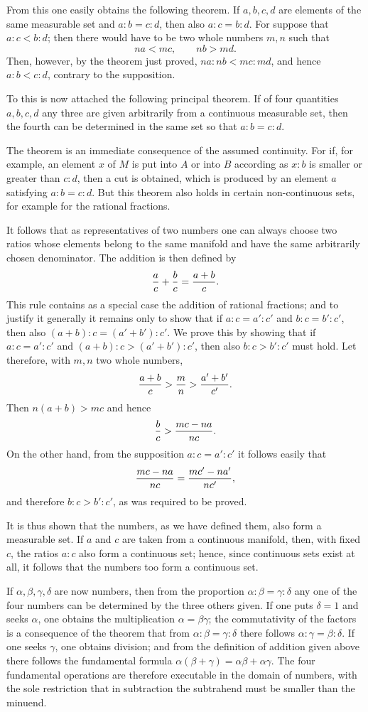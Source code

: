 \documentclass[11pt]{article}
\begin{document}
From this one easily obtains the following theorem. If $a,b,c,d$ are elements of the same measurable set and $a:b=c:d$, then also $a:c=b:d$. For suppose that $a:c<b:d$; then there would have to be two whole numbers $m,n$ such that
\[
 na<mc,
 \qquad nb>md.
\]
Then, however, by the theorem just proved, $na:nb<mc:md$, and hence $a:b<c:d$, contrary to the supposition.

To this is now attached the following principal theorem. If of four quantities $a,b,c,d$ any three are given arbitrarily from a continuous measurable set, then the fourth can be determined in the same set so that $a:b=c:d$.

The theorem is an immediate consequence of the assumed continuity. For if, for example, an element $x$ of $M$ is put into $A$ or into $B$ according as $x:b$ is smaller or greater than $c:d$, then a cut is obtained, which is produced by an element $a$ satisfying $a:b=c:d$. But this theorem also holds in certain non-continuous sets, for example for the rational fractions.

It follows that as representatives of two numbers one can always choose two ratios whose elements belong to the same manifold and have the same arbitrarily chosen denominator. The addition is then defined by
\[
 {a\over c}+{b\over c}={a+b\over c}.
\]
This rule contains as a special case the addition of rational fractions; and to justify it generally it remains only to show that if $a:c=a':c'$ and $b:c=b':c'$, then also $(a+b):c=(a'+b'):c'$. We prove this by showing that if $a:c=a':c'$ and $(a+b):c>(a'+b'):c'$, then also $b:c>b':c'$ must hold. Let therefore, with $m,n$ two whole numbers,
\[
 {a+b\over c}>{m\over n}>{a'+b'
\over c'}.
\]
Then $n(a+b)>mc$ and hence
\[
 {b\over c}>{mc-na\over nc}.
\]
On the other hand, from the supposition $a:c=a':c'$ it follows easily that
\[
 {mc-na\over nc}={mc'-na'\over nc'},
\]
and therefore $b:c>b':c'$, as was required to be proved.

It is thus shown that the numbers, as we have defined them, also form a measurable set. If $a$ and $c$ are taken from a continuous manifold, then, with fixed $c$, the ratios $a:c$ also form a continuous set; hence, since continuous sets exist at all, it follows that the numbers too form a continuous set.

If $\alpha,\beta,\gamma,\delta$ are now numbers, then from the proportion $\alpha:\beta=\gamma:\delta$ any one of the four numbers can be determined by the three others given. If one puts $\delta=1$ and seeks $\alpha$, one obtains the multiplication $\alpha=\beta\gamma$; the commutativity of the factors is a consequence of the theorem that from $\alpha:\beta=\gamma:\delta$ there follows $\alpha:\gamma=\beta:\delta$. If one seeks $\gamma$, one obtains division; and from the definition of addition given above there follows the fundamental formula $\alpha(\beta+\gamma)=\alpha\beta+\alpha\gamma$. The four fundamental operations are therefore executable in the domain of numbers, with the sole restriction that in subtraction the subtrahend must be smaller than the minuend.
\end{document}
